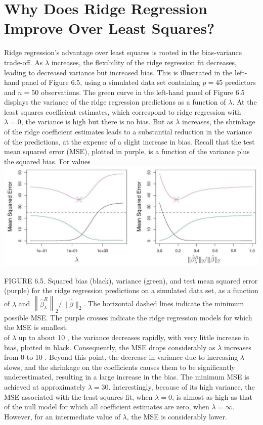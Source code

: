 \documentclass[10pt]{article}
\begin{document}
\section*{Why Does Ridge Regression Improve Over Least Squares?}
Ridge regression's advantage over least squares is rooted in the bias-variance trade-off. As $\lambda$ increases, the flexibility of the ridge regression fit decreases, leading to decreased variance but increased bias. This is illustrated in the left-hand panel of Figure 6.5, using a simulated data set containing $p=45$ predictors and $n=50$ observations. The green curve in the left-hand panel of Figure 6.5 displays the variance of the ridge regression predictions as a function of $\lambda$. At the least squares coefficient estimates, which correspond to ridge regression with $\lambda=0$, the variance is high but there is no bias. But as $\lambda$ increases, the shrinkage of the ridge coefficient estimates leads to a substantial reduction in the variance of the predictions, at the expense of a slight increase in bias. Recall that the test mean squared error (MSE), plotted in purple, is a function of the variance plus the squared bias. For values\\
\includegraphics[max width=\textwidth, center]{2025_05_05_efe77898333945044de4g-233}

FIGURE 6.5. Squared bias (black), variance (green), and test mean squared error (purple) for the ridge regression predictions on a simulated data set, as a function of $\lambda$ and $\left\|\hat{\beta}_{\lambda}^{R}\right\|_{2} /\|\hat{\beta}\|_{2}$. The horizontal dashed lines indicate the minimum possible MSE. The purple crosses indicate the ridge regression models for which the MSE is smallest.\\
of $\lambda$ up to about 10 , the variance decreases rapidly, with very little increase in bias, plotted in black. Consequently, the MSE drops considerably as $\lambda$ increases from 0 to 10 . Beyond this point, the decrease in variance due to increasing $\lambda$ slows, and the shrinkage on the coefficients causes them to be significantly underestimated, resulting in a large increase in the bias. The minimum MSE is achieved at approximately $\lambda=30$. Interestingly, because of its high variance, the MSE associated with the least squares fit, when $\lambda=0$, is almost as high as that of the null model for which all coefficient estimates are zero, when $\lambda=\infty$. However, for an intermediate value of $\lambda$, the MSE is considerably lower.
\end{document}
